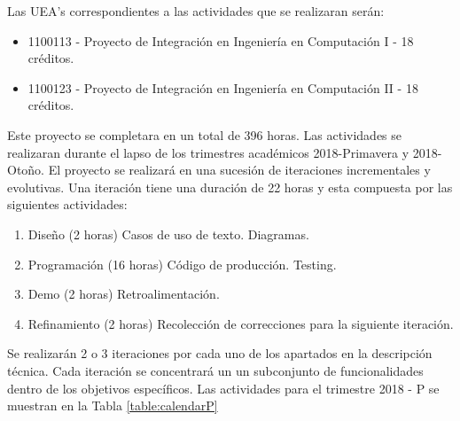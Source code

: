 Las UEA's correspondientes a las actividades que se realizaran serán:
\begin{itemize}
	\item 1100113 - Proyecto de Integración en Ingeniería en Computación I - 18 créditos.
	\item 1100123 - Proyecto de Integración en Ingeniería en Computación II - 18 créditos.
\end{itemize} 
 Este proyecto se completara en un total de 396 horas. Las actividades se realizaran durante el lapso de los trimestres académicos 2018-Primavera y 2018-Otoño. El proyecto se realizará en una sucesión de iteraciones incrementales y evolutivas. Una iteración tiene una duración de 22 horas y esta compuesta por las siguientes actividades: 
\begin{enumerate}
	\item Diseño (2 horas)
	\subitem Casos de uso de texto.
	\subitem Diagramas.
	\item Programación (16 horas)
	\subitem Código de producción.
	\subitem Testing.
	\item Demo (2 horas)
	\subitem Retroalimentación.
	\item Refinamiento (2 horas)
	\subitem Recolección de correcciones para la siguiente iteración.
\end{enumerate}

Se realizarán 2 o 3 iteraciones por cada uno de los apartados en la descripción técnica. Cada iteración se concentrará un un subconjunto de funcionalidades dentro de los objetivos específicos. 
Las actividades para el trimestre 2018 - P se muestran en la Tabla \ref{table:calendarP}

\newcommand\rownumber{\stepcounter{iteracion}\arabic{iteracion}}


